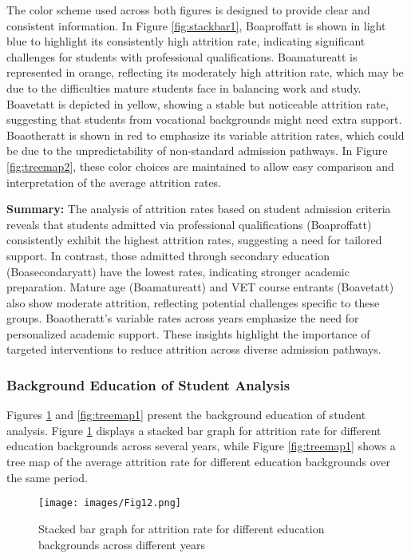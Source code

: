 \documentclass[conference]{IEEEtran}
\begin{document}
The color scheme used across both figures is designed to provide clear and consistent information. In Figure \ref{fig:stackbar1}, Boaproffatt is shown in light blue to highlight its consistently high attrition rate, indicating significant challenges for students with professional qualifications. Boamatureatt is represented in orange, reflecting its moderately high attrition rate, which may be due to the difficulties mature students face in balancing work and study. Boavetatt is depicted in yellow, showing a stable but noticeable attrition rate, suggesting that students from vocational backgrounds might need extra support. Boaotheratt is shown in red to emphasize its variable attrition rates, which could be due to the unpredictability of non-standard admission pathways. In Figure \ref{fig:treemap2}, these color choices are maintained to allow easy comparison and interpretation of the average attrition rates.

\textbf{Summary:} The analysis of attrition rates based on student admission criteria reveals that students admitted via professional qualifications (Boaproffatt) consistently exhibit the highest attrition rates, suggesting a need for tailored support. In contrast, those admitted through secondary education (Boasecondaryatt) have the lowest rates, indicating stronger academic preparation. Mature age (Boamatureatt) and VET course entrants (Boavetatt) also show moderate attrition, reflecting potential challenges specific to these groups. Boaotheratt’s variable rates across years emphasize the need for personalized academic support. These insights highlight the importance of targeted interventions to reduce attrition across diverse admission pathways.



\subsubsection{Background Education of Student Analysis}
Figures \ref{fig:stackbar2} and \ref{fig:treemap1} present the background education of student analysis. Figure \ref{fig:stackbar2} displays a stacked bar graph for attrition rate for different education backgrounds across several years, while Figure \ref{fig:treemap1} shows a tree map of the average attrition rate for different education backgrounds over the same period.

\begin{figure}[H]
    \centering
    \texttt{[image: images/Fig12.png]}
    \caption{Stacked bar graph for attrition rate for different education backgrounds across different years}
    \label{fig:stackbar2}
\end{figure}
\end{document}
